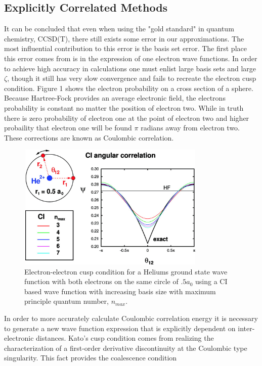   \subsection{Explicitly Correlated Methods}
    It can be concluded that even when using the "gold standard" in quantum chemistry, CCSD(T), there still exists some error in our approximations.  The most influential contribution to this error is the basis set error.  The first place this error comes from is in the expression of one electron wave functions.  In order to achieve high accuracy in calculations one must enlist large basis sets and large $\zeta$, though it still has very slow convergence and fails to recreate the electron cusp condition.  Figure 1 shows the electron probability on a cross section of a sphere.  Because Hartree-Fock provides an average electronic field, the electrons probability is constant no matter the position of electron two.  While in truth there is zero probability of electron one at the point of electron two and higher probaility that electron one will be found $\pi$ radians away from electron two.  These corrections are known as Coulombic correlation. 
    \begin{figure}[H]
      \centering
        \includegraphics[width = 9cm, height = 6cm]{./pics/ang.jpeg}
        \caption{Electron-electron cusp condition for a Heliums ground state wave function with both electrons on the same circle of $.5 a_0$ using a CI based wave function with increasing basis size with maximum principle quantum number, $n_{max}$\cite{Hatting 2012}.}
    \end{figure}
    In order to more accurately calculate Coulombic correlation energy it is necessary to generate a new wave function expression that is explicitly dependent on inter-electronic distances. Kato's cusp condition\cite{kato 1957} comes from realizing the characterization of a first-order derivative discontinuity at the Coulombic type singularity\cite{Hatting 2012}. This fact provides the coalescence condition 
